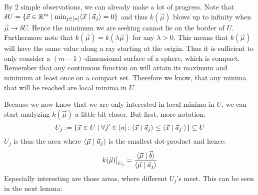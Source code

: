 By 2 simple observations, we can already make a lot of progress. Note that $\delta U = \{\vec x \in \mathbb{R}^m \mid \min_{j \in [n]}\langle \vec x \mid \vec a_j \rangle = 0\}$ and thus $k(\vec \mu)$ blows up to infinity when $\vec \mu \to \delta U$. Hence the minimum we are seeking cannot lie on the border of $U$. Furthermore note that $k(\vec \mu) = k(\lambda \vec\mu)$ for any $\lambda > 0$. This means that $k(\vec \mu)$ will have the same value along a ray starting at the origin. Thus it is sufficient to only consider a $(m-1)$-dimensional surface of a sphere, which is compact. Remember that any continuous function on will attain its maximum and minimum at least once on a compact set. Therefore we know, that any minima that will be reached are local minima in $U$.

Because we now know that we are only interested in local minima in $U$, we can start analyzing $k(\vec \mu)$ a little bit closer. But first, more notation:
$$U_j := \{\vec x \in U \mid \forall j' \in [n]\colon \langle \vec x \mid \vec a_j \rangle \leq \langle \vec x \mid \vec a_{j'} \rangle\} \subseteq U$$
$U_j$ is thus the area where $\langle \vec\mu \mid \vec a_j \rangle$ is the smallest dot-product and hence:
$$\restrict{k(\vec\mu)}{U_j} = \frac{\sprod{\vec\mu}{\vec b}}{\sprod{\vec\mu}{\vec a_j}}$$
Especially interesting are those areas, where different $U_j$'s meet. This can be seen in the next lemma:

